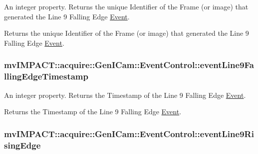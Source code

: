 An integer property. Returns the unique Identifier of the Frame (or image) that generated the Line 9 Falling Edge \hyperlink{classmv_i_m_p_a_c_t_1_1acquire_1_1_event}{Event}. 

Returns the unique Identifier of the Frame (or image) that generated the Line 9 Falling Edge \hyperlink{classmv_i_m_p_a_c_t_1_1acquire_1_1_event}{Event}. \hypertarget{classmv_i_m_p_a_c_t_1_1acquire_1_1_gen_i_cam_1_1_event_control_a56832c12a54d4776449685346cfd05da}{
\subsubsection[{event\+Line9\+Falling\+Edge\+Timestamp}]{ mv\+I\+M\+P\+A\+C\+T\+::acquire\+::\+Gen\+I\+Cam\+::\+Event\+Control\+::event\+Line9\+Falling\+Edge\+Timestamp}}\label{classmv_i_m_p_a_c_t_1_1acquire_1_1_gen_i_cam_1_1_event_control_a56832c12a54d4776449685346cfd05da}


An integer property. Returns the Timestamp of the Line 9 Falling Edge \hyperlink{classmv_i_m_p_a_c_t_1_1acquire_1_1_event}{Event}. 

Returns the Timestamp of the Line 9 Falling Edge \hyperlink{classmv_i_m_p_a_c_t_1_1acquire_1_1_event}{Event}. \hypertarget{classmv_i_m_p_a_c_t_1_1acquire_1_1_gen_i_cam_1_1_event_control_aae241d88190705bcef9fdf9661cb51c3}{
\subsubsection[{event\+Line9\+Rising\+Edge}]{ mv\+I\+M\+P\+A\+C\+T\+::acquire\+::\+Gen\+I\+Cam\+::\+Event\+Control\+::event\+Line9\+Rising\+Edge}}\label{classmv_i_m_p_a_c_t_1_1acquire_1_1_gen_i_cam_1_1_event_control_aae241d88190705bcef9fdf9661cb51c3}



